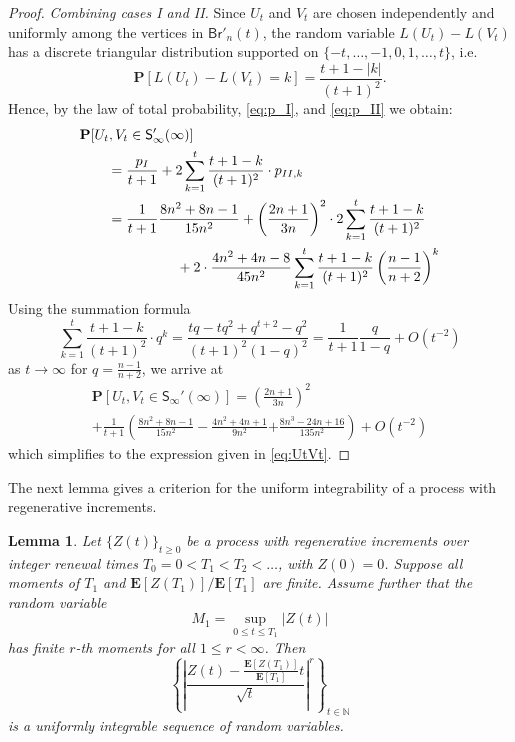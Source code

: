 \documentclass[a4paper,11pt,reqno]{amsart}
\newcommand{\IN}{\mathbb{N}}
\newcommand{\bP}{\mathbf{P}}
\newcommand{\bE}{\mathbf{E}}
\newcommand{\Br}{\mathsf{Br}}
\newcommand{\Soo}{\mathsf{S}_\infty}
\newtheorem{lemma}{Lemma}
\theoremstyle{definition}
\begin{document}
\begin{proof}
 \emph{Combining cases I and II.} Since $U_t$ and $V_t$ are chosen independently and uniformly among the vertices in $\Br'_n(t)$, the random variable $L(U_t)-L(V_t)$ has a discrete triangular distribution supported on $\{-t,\dots,-1,0,1,\dots,t\}$, i.e.
 \[
  \bP[L(U_t)-L(V_t)=k] = \frac{t+1-|k|}{(t+1)^2}.
 \]
 Hence, by the law of total probability, \eqref{eq:p_I}, and \eqref{eq:p_II} we obtain: 
 \begin{align*}
  \MoveEqLeft\bP[U_t,V_t\in\Soo'(\infty)]\\
  &=\frac{p_I}{t+1} + 2 \sum_{k=1}^t \frac{t+1-k}{(t+1)^2} \cdot p_{II,k}\\
  &\begin{multlined}
  = \frac{1}{t+1} \frac{8n^2+8n-1}{15n^2} + \left(\frac{2n+1}{3n}\right)^2 \cdot 2 \sum_{k=1}^t \frac{t+1-k}{(t+1)^2} \\
     \qquad  + 2\cdot \frac{4n^2+4n-8}{45n^2}\sum_{k=1}^t \frac{t+1-k}{(t+1)^2}\left(\frac{n-1}{n+2}\right)^k
  \end{multlined}
 \end{align*}
 Using the summation formula
 \[
  \sum_{k=1}^t \frac{t+1-k}{(t+1)^2}\cdot q^k = \frac{tq-tq^2+q^{t+2}-q^2}{(t+1)^2(1-q)^2} = \frac{1}{t+1}\frac{q}{1-q} + O(t^{-2})
 \]
 as $t\to\infty$ for $q=\frac{n-1}{n+2}$, we arrive at 
 \begin{multline*}
  \bP[U_t,V_t\in\Soo'(\infty)]=\left(\frac{2n+1}{3n}\right)^2\\
  + \frac{1}{t+1}\left(\frac{8n^2+8n-1}{15n^2}-\frac{4n^2+4n+1}{9n^2}\right.
   \left. + \frac{8n^3-24n+16}{135n^2}\right) + O(t^{-2})
 \end{multline*}
 which simplifies to the expression given in \eqref{eq:UtVt}.
\end{proof}

The next lemma gives a criterion for the uniform integrability of a process with regenerative increments.

\begin{lemma}\label{lemma:SooUI}
 Let $\{Z(t)\}_{t\geq0}$ be a process with regenerative increments over integer renewal times $T_0=0<T_1<T_2<\dots$, with $Z(0)=0$. Suppose all moments of $T_1$ and $\bE[Z(T_1)]/\bE[T_1]$ are finite. Assume further that the random variable  
 \begin{equation*}
  M_1=\sup_{0\leq t\leq T_1} \left|Z(t)\right|
 \end{equation*}
 has finite $r$-th moments for all $1\leq r<\infty$. Then
 \[
  \left\{ \left|\frac{Z(t)-\frac{\bE[Z(T_1)]}{\bE[T_1]}t}{\sqrt{t}}\right|^r \right\}_{t\in\IN}
 \]
 is a uniformly integrable sequence of random variables. 
\end{lemma}
\end{document}
